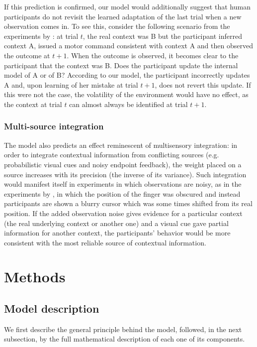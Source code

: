 \documentclass[a4paper,doc,floatsintext,natbib]{apa6}
\begin{document}
If this prediction is confirmed, our model would additionally suggest that human participants do not revisit the learned adaptation of the last trial when a new observation comes in. To see this, consider the following scenario from the experiments by \cite{Herzfeld_memory_2014}: at trial $t$, the real context was B but the participant inferred context A, issued a motor command consistent with context A and then observed the outcome at $t + 1$. When the outcome is observed, it becomes clear to the participant that the context was B. Does the participant update the internal model of A or of B? According to our model, the participant incorrectly updates A and, upon learning of her mistake at trial $t+1$, does not revert this update. If this were not the case, the volatility of the environment would have no effect, as the context at trial $t$ can almost always be identified at trial $t+1$.

\subsubsection{Multi-source integration}
The model also predicts an effect reminescent of multisensory integration: in order to integrate contextual information from conflicting sources (e.g. probabilistic visual cues and noisy endpoint feedback), the weight placed on a source increases with its precision (the inverse of its variance). Such integration would manifest itself in experiments in which observations are noisy, as in the experiments by \cite{Kording_Bayesian_2004}, in which the position of the finger was obscured and instead participants are shown a blurry cursor which was some times shifted from its real position. If the added observation noise gives evidence for a particular context (the real underlying context or another one) and a visual cue gave partial information for another context, the participants' behavior would be more consistent with the most reliable source of contextual information.



\section{Methods}
\subsection{Model description}
\label{subsection:model-description}
We first describe the general principle behind the model, followed, in the next
subsection, by the full mathematical description of each one of its components.
\end{document}
